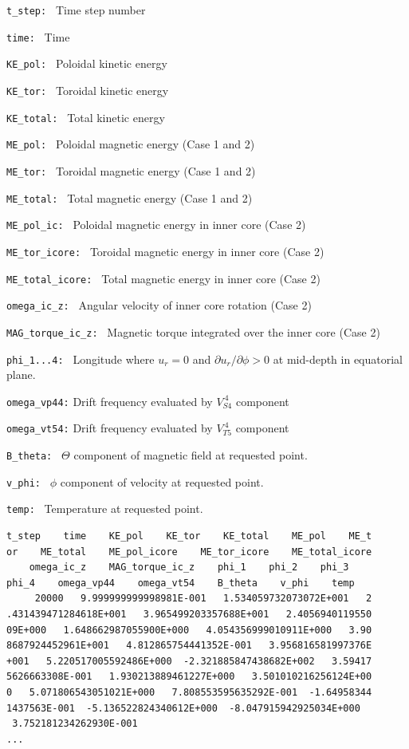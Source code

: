 \begin{description}
\item{\tt t\_step:  }  Time step number
\item{\tt time:     }  Time
\item{\tt KE\_pol:   }  Poloidal kinetic energy
\item{\tt KE\_tor:   }  Toroidal kinetic energy
\item{\tt KE\_total: }  Total kinetic energy
\item{\tt ME\_pol:   }  Poloidal magnetic energy  (Case 1 and 2)
\item{\tt ME\_tor:   }  Toroidal magnetic energy  (Case 1 and 2)
\item{\tt ME\_total: }  Total magnetic energy  (Case 1 and 2)
\item{\tt ME\_pol\_ic:      }  Poloidal magnetic energy in inner core  (Case 2)
\item{\tt ME\_tor\_icore:   }  Toroidal magnetic energy in inner core (Case 2)
\item{\tt ME\_total\_icore: }  Total magnetic energy in inner core (Case 2)
\item{\tt omega\_ic\_z: } Angular velocity of inner core rotation (Case 2)
\item{\tt MAG\_torque\_ic\_z: }  Magnetic torque integrated over the inner core (Case 2)
\item{\tt phi\_1...4: } Longitude where $u_{r} = 0$ and $\partial u_{r} / \partial \phi > 0$ at mid-depth in equatorial plane.
\item{\tt omega\_vp44:} Drift frequency evaluated by $V_{S4}^{\ 4}$ component
\item{\tt omega\_vt54:} Drift frequency evaluated by $V_{T5}^{\ 4}$ component
\item{\tt B\_theta: } $\Theta$ component of magnetic field at requested point.
\item{\tt v\_phi: } $\phi$ component of velocity at requested point.
\item{\tt temp: } Temperature at requested point.


\end{description}

{\small 
\begin{verbatim}
t_step    time    KE_pol    KE_tor    KE_total    ME_pol    ME_t
or    ME_total    ME_pol_icore    ME_tor_icore    ME_total_icore
    omega_ic_z    MAG_torque_ic_z    phi_1    phi_2    phi_3    
phi_4    omega_vp44    omega_vt54    B_theta    v_phi    temp
     20000   9.999999999998981E-001   1.534059732073072E+001   2
.431439471284618E+001   3.965499203357688E+001   2.4056940119550
09E+000   1.648662987055900E+000   4.054356999010911E+000   3.90
8687924452961E+001   4.812865754441352E-001   3.956816581997376E
+001   5.220517005592486E+000  -2.321885847438682E+002   3.59417
5626663308E-001   1.930213889461227E+000   3.501010216256124E+00
0   5.071806543051021E+000   7.808553595635292E-001  -1.64958344
1437563E-001  -5.136522824340612E+000  -8.047915942925034E+000  
 3.752181234262930E-001
...
\end{verbatim}
}
 
